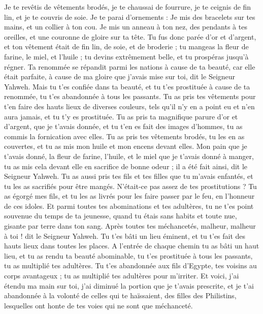 \begin{multicols}{2}
Je te revêtis de vêtements brodés, je te chaussai de fourrure, je te ceignis de fin lin, et je te couvris de soie.
Je te parai d'ornements : Je mis des bracelets sur tes mains, et un collier à ton cou.
Je mis un anneau à ton nez, des pendants à tes oreilles, et une couronne de gloire sur ta tête.
Tu fus donc parée d'or et d'argent, et ton vêtement était de fin lin, de soie, et de broderie ; tu mangeas la fleur de farine, le miel, et l'huile ; tu devins extrêmement belle, et tu prospéras jusqu'à régner.
Ta renommée se répandit parmi les nations à cause de ta beauté, car elle était parfaite, à cause de ma gloire que j'avais mise sur toi, dit le Seigneur Yahweh.
Mais tu t'es confiée dans ta beauté, et tu t'es prostituée à cause de ta renommée, tu t'es abandonnée à tous les passants.
Tu as pris tes vêtements pour t'en faire des hauts lieux de diverses couleurs, tels qu'il n'y en a point eu et n'en aura jamais, et tu t'y es prostituée.
Tu as pris ta magnifique parure d'or et d'argent, que je t'avais donnée, et tu t'en es fait des images d'hommes, tu as commis la fornication avec elles.
Tu as pris tes vêtements brodés, tu les en as couvertes, et tu as mis mon huile et mon encens devant elles.
Mon pain que je t'avais donné, la fleur de farine, l'huile, et le miel que je t'avais donné à manger, tu as mis cela devant elle en sacrifice de bonne odeur ; il a été fait ainsi, dit le Seigneur Yahweh.
Tu as aussi pris tes fils et tes filles que tu m'avais enfantés, et tu les as sacrifiés pour être mangés. N'était-ce pas assez de tes prostitutions ?
Tu as égorgé mes fils, et tu les as livrés pour les faire passer par le feu, en l'honneur de ces idoles.
Et parmi toutes tes abominations et tes adultères, tu ne t'es point souvenue du temps de ta jeunesse, quand tu étais sans habits et toute nue, gisante par terre dans ton sang.
Après toutes tes méchancetés, malheur, malheur à toi ! dit le Seigneur Yahweh.
Tu t'es bâti un lieu éminent, et tu t'es fait des hauts lieux dans toutes les places.
A l'entrée de chaque chemin tu as bâti un haut lieu, et tu as rendu ta beauté abominable, tu t'es prostituée à tous les passants, tu as multiplié tes adultères.
Tu t'es abandonnée aux fils d'Egypte, tes voisins au corps avantageux ; tu as multiplié tes adultères pour m'irriter.
Et voici, j'ai étendu ma main sur toi, j'ai diminué la portion que je t'avais prescrite, et je t'ai abandonnée à la volonté de celles qui te haïssaient, des filles des Philistins, lesquelles ont honte de tes voies qui ne sont que méchanceté.

\end{multicols}

